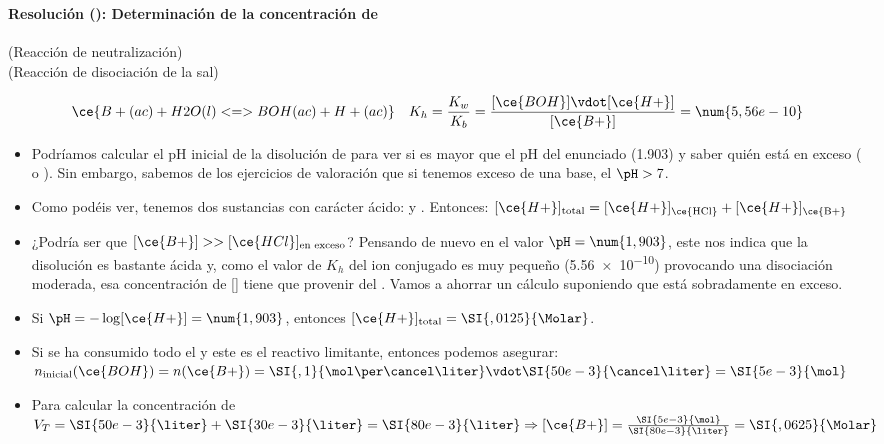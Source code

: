 \begin{frame}
	\frametitle{\ejerciciocmd}
	\framesubtitle{Resolución (): Determinación de la concentración de }
	\begin{center}
		 (Reacción de neutralización)\\
		 (Reacción de disociación de la sal)\\
	\end{center}
	$$
		\ce{B+(ac) + H2O(l) <=> BOH(ac) + H+(ac)}\quad K_h=\frac{K_w}{K_b}=\frac{[\ce{BOH}]\vdot[\ce{H+}]}{[\ce{B+}]}=\num{5,56e-10}
	$$
	\begin{overprint}
			\begin{itemize}
				\item Podríamos calcular el pH inicial de la disolución de  para ver si es mayor que el pH del enunciado (\num{1,903}) y saber quién está en exceso ( o ). Sin embargo, sabemos de los ejercicios de valoración que si tenemos exceso de una base, el $\pH>7$.
				\item Como podéis ver, tenemos dos sustancias con carácter ácido: \textbf{} y \textbf{}. Entonces: $[\ce{H+}]_\text{total}=[\ce{H+}]_\text{\ce{HCl}} + [\ce{H+}]_\text{\ce{B+}}$
				\item ¿Podría ser que $[\ce{B+}]>>[\ce{HCl}]_{\text{en exceso}}$? Pensando de nuevo en el valor $\pH=\num{1,903}$, este nos indica que la disolución es bastante ácida y, como el valor de $K_h$ del ion conjugado es muy pequeño (\num{5,56e-10}) provocando una disociación moderada, esa concentración de [] tiene que provenir del . Vamos a ahorrar un cálculo suponiendo que  está sobradamente en exceso.
				\item Si $\pH = -\log[\ce{H+}] = \num{1,903}$, entonces $[\ce{H+}]_\text{total}=\SI{,0125}{\Molar}$.
				\item Si se ha consumido todo el  y este es el reactivo limitante, entonces podemos asegurar: $n_{\text{inicial}}(\ce{BOH})=n(\ce{B+})=\SI{,1}{\mol\per\cancel\liter}\vdot\SI{50e-3}{\cancel\liter}=\SI{5e-3}{\mol}$
				\item Para calcular la concentración de  $V_T = \SI{50e-3}{\liter}+\SI{30e-3}{\liter}=\SI{80e-3}{\liter}\Rightarrow [\ce{B+}] = \frac{\SI{5e-3}{\mol}}{\SI{80e-3}{\liter}}=\SI{,0625}{\Molar}$
			\end{itemize}

\end{overprint}
\end{frame}
